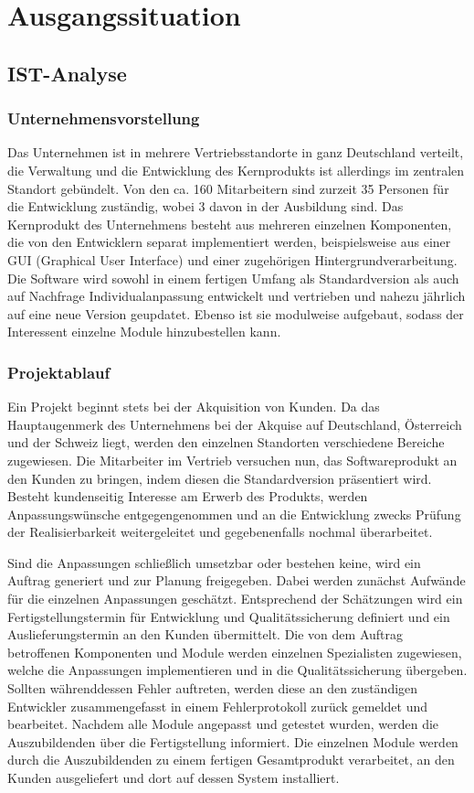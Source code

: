 \newpage
\section{Ausgangssituation}
\subsection{IST-Analyse}
\subsubsection{Unternehmensvorstellung}
Das Unternehmen ist in mehrere Vertriebsstandorte in ganz Deutschland verteilt, die Verwaltung und die Entwicklung des Kernprodukts ist allerdings im zentralen Standort gebündelt. Von den ca. 160 Mitarbeitern sind zurzeit 35 Personen für die Entwicklung zuständig, wobei 3 davon in der Ausbildung sind. Das Kernprodukt des Unternehmens besteht aus mehreren einzelnen Komponenten, die von den Entwicklern separat implementiert werden, beispielsweise aus einer GUI (Graphical User Interface) und einer zugehörigen Hintergrundverarbeitung. Die Software wird sowohl in einem fertigen Umfang als Standardversion als auch auf Nachfrage Individualanpassung entwickelt und vertrieben und nahezu jährlich auf eine neue Version geupdatet. Ebenso ist sie modulweise aufgebaut, sodass der Interessent einzelne Module hinzubestellen kann.

\subsubsection{Projektablauf}
Ein Projekt beginnt stets bei der Akquisition von Kunden. Da das Hauptaugenmerk des Unternehmens bei der Akquise auf Deutschland, Österreich und der Schweiz liegt, werden den einzelnen Standorten verschiedene Bereiche zugewiesen. Die Mitarbeiter im Vertrieb versuchen nun, das Softwareprodukt an den Kunden zu bringen, indem diesen die Standardversion präsentiert wird. Besteht kundenseitig Interesse am Erwerb des Produkts, werden Anpassungswünsche entgegengenommen und an die Entwicklung zwecks Prüfung der Realisierbarkeit weitergeleitet und gegebenenfalls nochmal überarbeitet.

Sind die Anpassungen schließlich umsetzbar oder bestehen keine, wird ein Auftrag generiert und zur Planung freigegeben. Dabei werden zunächst Aufwände für die einzelnen Anpassungen geschätzt. Entsprechend der Schätzungen wird ein Fertigstellungstermin für Entwicklung und Qualitätssicherung definiert und ein Auslieferungstermin an den Kunden übermittelt. Die von dem Auftrag betroffenen Komponenten und Module werden einzelnen Spezialisten zugewiesen, welche die Anpassungen implementieren und in die Qualitätssicherung übergeben. Sollten währenddessen Fehler auftreten, werden diese an den zuständigen Entwickler zusammengefasst in einem Fehlerprotokoll zurück gemeldet und bearbeitet. Nachdem alle Module angepasst und getestet wurden, werden die Auszubildenden über die Fertigstellung informiert. Die einzelnen Module werden durch die Auszubildenden zu einem fertigen Gesamtprodukt verarbeitet, an den Kunden ausgeliefert und dort auf dessen System installiert.

